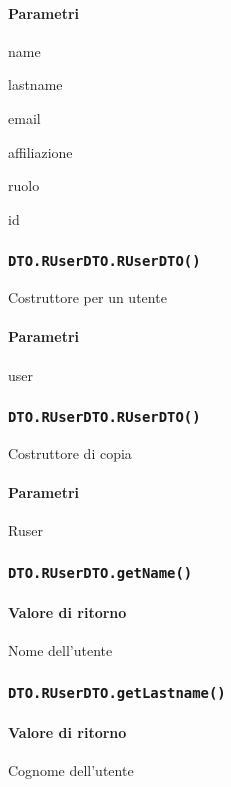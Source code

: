 \paragraph{Parametri}
\begin{description}
\item name
\item lastname
\item email
\item affiliazione
\item ruolo
\item id
\end{description}
\subsubsection{\texttt{DTO.RUserDTO.RUserDTO()}}
Costruttore per un utente
\paragraph{Parametri}
\begin{description}
\item user
\end{description}
\subsubsection{\texttt{DTO.RUserDTO.RUserDTO()}}
Costruttore di copia
\paragraph{Parametri}
\begin{description}
\item Ruser
\end{description}
\subsubsection{\texttt{DTO.RUserDTO.getName()}}
\paragraph{Valore di ritorno}
\begin{description}
\item Nome dell'utente
\end{description}
\subsubsection{\texttt{DTO.RUserDTO.getLastname()}}
\paragraph{Valore di ritorno}
\begin{description}
\item Cognome dell'utente
\end{description}
